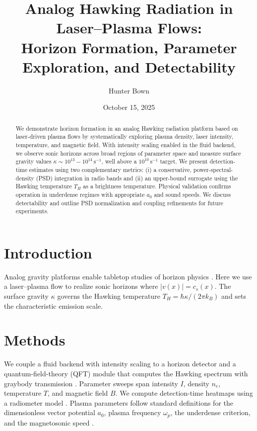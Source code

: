 \documentclass[11pt]{article}
\title{Analog Hawking Radiation in Laser--Plasma Flows:\\Horizon Formation, Parameter Exploration, and Detectability}
\author{Hunter Bown}
\date{October 15, 2025}
\begin{document}
\maketitle

\begin{abstract}
We demonstrate horizon formation in an analog Hawking radiation platform based on laser-driven plasma flows by systematically exploring plasma density, laser intensity, temperature, and magnetic field. With intensity scaling enabled in the fluid backend, we observe sonic horizons across broad regions of parameter space and measure surface gravity values $\kappa \sim 10^{13}{-}10^{14}\,\mathrm{s^{-1}}$, well above a $10^{10}\,\mathrm{s^{-1}}$ target. We present detection-time estimates using two complementary metrics: (i) a conservative, power-spectral-density (PSD) integration in radio bands and (ii) an upper-bound surrogate using the Hawking temperature $T_H$ as a brightness temperature. Physical validation confirms operation in underdense regimes with appropriate $a_0$ and sound speeds. We discuss detectability and outline PSD normalization and coupling refinements for future experiments.
\end{abstract}

\section{Introduction}
Analog gravity platforms enable tabletop studies of horizon physics \cite{Hawking1974,Hawking1975,Unruh1981,Barcelo2011,Weinfurtner2011,Steinhauer2016,Drori2019}. Here we use a laser--plasma flow to realize sonic horizons where $|v(x)| = c_s(x)$. The surface gravity $\kappa$ governs the Hawking temperature $T_H = \hbar \kappa/(2\pi k_B)$ and sets the characteristic emission scale.

\section{Methods}
We couple a fluid backend with intensity scaling to a horizon detector and a quantum-field-theory (QFT) module that computes the Hawking spectrum with graybody transmission \cite{Planck1901,Page1976}. Parameter sweeps span intensity $I$, density $n_e$, temperature $T$, and magnetic field $B$. We compute detection-time heatmaps using a radiometer model \cite{Wilson2013}.
Plasma parameters follow standard definitions for the dimensionless vector potential $a_0$, plasma frequency $\omega_p$, the underdense criterion, and the magnetosonic speed \cite{Esarey2009,Chen2016}.
\end{document}
